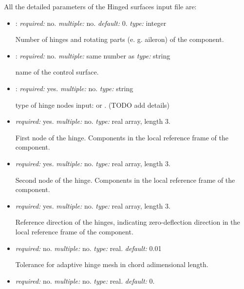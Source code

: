 All the detailed parameters of the Hinged surfaces input file are: 
\begin{itemize}
    \item {}: \textit{required:} no.  \textit{multiple:} no. \textit{default:} 0.
    \textit{type:} integer
    
    Number of hinges and rotating parts (e. g. aileron) of the component.
    
    \item {}: \textit{required:} no. \textit{multiple:} same number as  \textit{type:} string 
    
    name of the control surface.
    
    \item {}: \textit{required:} yes. \textit{multiple:} no. \textit{type:} string
    
    type of hinge nodes input:  or . (TODO add details)
    
    \item {} \textit{required:} yes. \textit{multiple:} no. \textit{type:} real array, length 3.
    
    First node of the hinge. Components in the local reference frame of the component.
    
    \item {} \textit{required:} yes. \textit{multiple:} no. \textit{type:} real array, length 3.
    
    Second node of the hinge. Components in the local reference frame of the component.
    
    \item {} \textit{required:} yes. \textit{multiple:} no. \textit{type:} real array, length 3. 
    
    Reference direction of the hinges, indicating zero-deflection direction in the local reference frame of the component.
    
    \item {} \textit{required:} no. \textit{multiple:} no. \textit{type:} real. \textit{default:} 0.01
    
    Tolerance for adaptive hinge mesh in chord adimensional length. 
    
    \item {} \textit{required:} no. \textit{multiple:} no. \textit{type:} real. \textit{default:} 0.
    

\end{itemize}
